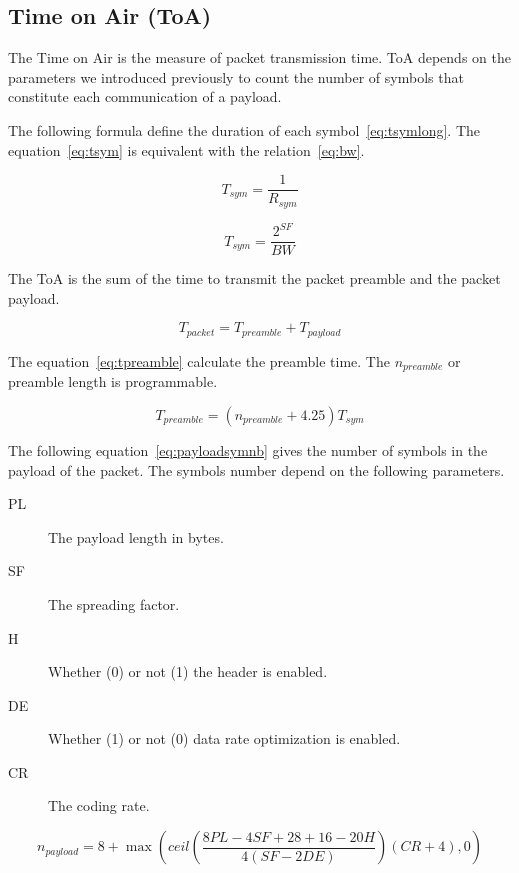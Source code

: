 \subsection{Time on Air (ToA)}

The Time on Air is the measure of packet transmission time.
ToA depends on the parameters we introduced previously to count the number of
symbols that constitute each communication of a payload.

The following formula define the duration of each symbol~\ref{eq:tsymlong}.
The equation~\ref{eq:tsym} is equivalent with the relation~\ref{eq:bw}.

\begin{equation}
  \label{eq:tsymlong}
  T_{sym} = \frac{1}{R_{sym}}
\end{equation}

\begin{equation}
  \label{eq:tsym}
  T_{sym} = \frac{2^{SF}}{BW}
\end{equation}

The ToA is the sum of the time to transmit the packet preamble and the packet
payload.

\begin{equation}
  \label{eq:tpacket}
  T_{packet} = T_{preamble} + T_{payload}
\end{equation}

The equation~\ref{eq:tpreamble} calculate the preamble time. The $n_{preamble}$
or preamble length is programmable.

\begin{equation}
  \label{eq:tpreamble}
  T_{preamble} = (n_{preamble} + 4.25)T_{sym}
\end{equation}

The following equation~\ref{eq:payloadsymnb} gives the number of symbols in the
payload of the packet.
The symbols number depend on the following parameters.

\begin{description}
  \item[PL] The payload length in bytes.
  \item[SF] The spreading factor.
  \item[H] Whether (0) or not (1) the header is enabled.
  \item[DE] Whether (1) or not (0) data rate optimization is enabled.
  \item[CR] The coding rate.
\end{description}

\begin{equation}
  \label{eq:payloadsymnb}
  n_{payload} = 8 + \max(ceil(\frac{8PL - 4SF + 28 + 16 - 20H}{4(SF - 2DE)})(CR + 4),0)
\end{equation}

